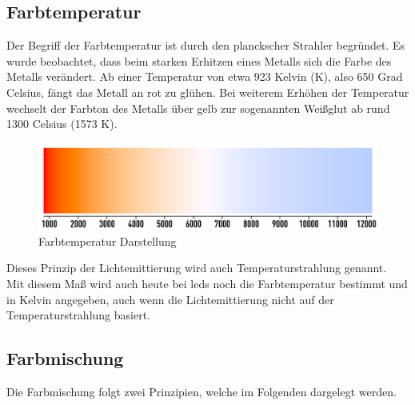 \documentclass[11pt]{scrartcl}
\begin{document}
\subsection{Farbtemperatur}
Der Begriff der Farbtemperatur ist durch den planckscher Strahler begründet. Es wurde beobachtet, dass beim starken Erhitzen eines Metalls
sich die Farbe des Metalls verändert. Ab einer Temperatur von etwa 923 Kelvin (K), also 650 Grad Celsius, fängt das Metall an rot zu glühen. Bei
weiterem Erhöhen der Temperatur wechselt der Farbton des Metalls über gelb zur sogenannten Weißglut ab rund {\color{red} 1300 Celsius (1573 K)}. %
\begin{figure}[H]
    \begin{center}
        \includegraphics[width=.8\textwidth]{images/thermal_radiation_figure.png}
    \end{center}
    \caption{Farbtemperatur Darstellung \cite{wikiFarbtemperatur}}
\end{figure}
\noindent
Dieses Prinzip der Lichtemittierung wird auch Temperaturstrahlung genannt.\\
Mit diesem Maß wird auch heute bei \ac{led}s noch die Farbtemperatur bestimmt und in Kelvin angegeben, auch wenn die Lichtemittierung nicht auf der
Temperaturstrahlung basiert.
\subsection{Farbmischung}
Die Farbmischung folgt zwei Prinzipien, welche im Folgenden dargelegt werden.
\end{document}

